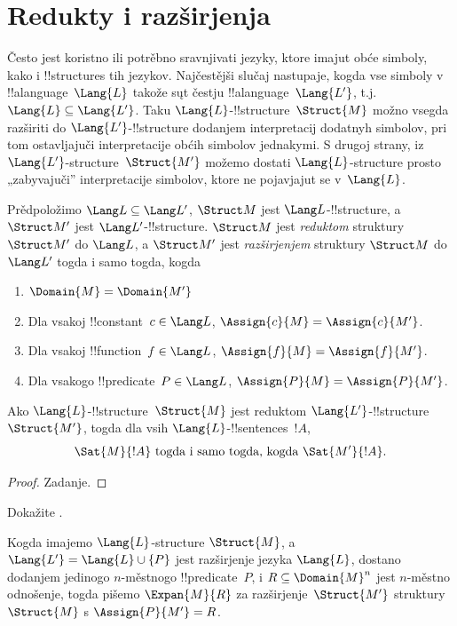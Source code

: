 \documentclass[../../../include/open-logic-section]{subfiles}
\begin{document}
\section{Redukty i razširjenja}

Često jest koristno ili potrěbno sravnjivati jezyky, ktore imajut
obće simboly, kako i !!{structure}s tih jezykov. Najčestějši slučaj
nastupaje, kogda vse simboly v !!a{language}~$\Lang{L}$ takože sųt
čestju !!a{language}~$\Lang{L'}$, t.j. $\Lang{L} \subseteq
\Lang{L'}$. Taku $\Lang{L}$-!!{structure}~$\Struct{M}$ možno vsegda
razširiti do $\Lang{L'}$-!!{structure} dodanjem interpretacij
dodatnyh simbolov, pri tom ostavljajuči interpretacije obćih simbolov
jednakymi. S drugoj strany, iz
$\Lang{L'}$-structure~$\Struct{M'}$ možemo dostati
$\Lang{L}$-structure prosto „zabyvajuči” interpretacije simbolov,
ktore ne pojavjajut se v~$\Lang{L}$.

\begin{defn}
Prědpoložimo $\Lang L \subseteq \Lang L'$, $\Struct M$ jest
$\Lang L$-!!{structure}, a $\Struct M'$ jest $\Lang L'$-!!{structure}.
$\Struct M$ jest \emph{reduktom} struktury $\Struct M'$ do $\Lang L$,
a $\Struct M'$ jest \emph{razširjenjem} struktury $\Struct M$ do
$\Lang L'$ togda i samo togda, kogda
\begin{enumerate}
\item $\Domain{M} = \Domain{M'}$
\item Dla vsakoj !!{constant}~$c \in \Lang L$, $\Assign{c}{M} =
  \Assign{c}{M'}$.
\item Dla vsakoj !!{function}~$f \in \Lang L$, $\Assign{f}{M} =
  \Assign{f}{M'}$.
\item Dla vsakogo !!{predicate}~$P \in \Lang L$, $\Assign{P}{M} =
  \Assign{P}{M'}$.
\end{enumerate}
\end{defn}

\begin{prop}
Ako $\Lang{L}$-!!{structure}~$\Struct{M}$ jest reduktom
$\Lang{L'}$-!!{structure}~$\Struct{M'}$, togda dla vsih
$\Lang{L}$-!!{sentence}s~$!A$,
\[
\Sat{M}{!A} \text{ togda i samo togda, kogda } \Sat{M'}{!A}.
\]
\end{prop}

\begin{proof}
  Zadanje.
\end{proof}

\begin{prob}
Dokažite .
\end{prob}

\begin{defn}
Kogda imajemo $\Lang{L}$-structure $\Struct{M}$, a $\Lang{L'} =
\Lang{L} \cup \{P\}$ jest razširjenje jezyka $\Lang{L}$, dostano
dodanjem jedinogo $n$-městnogo !!{predicate}~$P$, i
$R \subseteq \Domain{M}^n$ jest $n$-městno odnošenje, togda pišemo
$\Expan{M}{R}$ za razširjenje~$\Struct{M'}$ struktury~$\Struct{M}$ s
$\Assign{P}{M'} = R$.
\end{defn}
\end{document}
